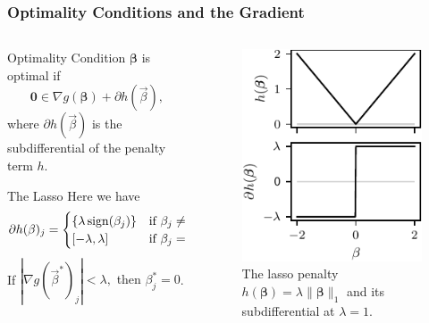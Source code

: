 \documentclass[10pt]{beamer}
\begin{document}
\begin{frame}[c]
  \frametitle{Optimality Conditions and the Gradient}

  \begin{columns}[T]
    \begin{column}{0.51\textwidth}
      \begin{block}{Optimality Condition}
        \(\bm{\beta}\) is optimal if
        \begin{equation*}
          \boldsymbol{0} \in \nabla g(\bm{\beta}) + \partial h(\vec{\beta}),
        \end{equation*}
        where \(\partial h (\vec{\beta})\) is the subdifferential of the penalty term \(h\).
      \end{block}

      \pause

      \begin{block}{The Lasso}
        Here we have
        \[
          \partial h (\beta)_j =
          \begin{cases}
            \{
            \lambda\operatorname{sign}(\beta_j)\} & \text{if } \beta_j \neq 0, \\
            [-\lambda, \lambda]     & \text{if } \beta_j = 0.
          \end{cases}
        \]
        If \(|\nabla g(\vec{\beta}^*)_j| < \lambda,\) \alert{then \(\beta_j^* = 0\)}.
      \end{block}

    \end{column}
    \begin{column}{0.39\textwidth}

      \begin{figure}[htpb]
        \centering
        \includegraphics{figures/paper1-subgradient-split.pdf}
        \caption{%
          The lasso penalty \(h(\bm{\beta}) = \lambda \lVert \bm{\beta}\rVert_1\) and its subdifferential at \(\lambda = 1\).
        }
      \end{figure}
    \end{column}
  \end{columns}

\end{frame}
\end{document}
